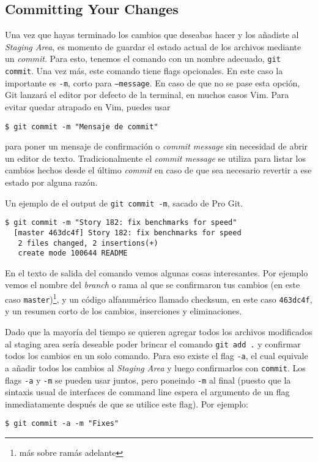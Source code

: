 \documentclass[spanish, 12pt, a4paper]{article}
\begin{document}
\subsection{Committing Your Changes}
Una vez que hayas terminado los cambios que deseabas hacer y los añadiste al
\textit{Staging Area}, es momento de guardar el estado actual de los archivos
mediante un \textit{commit}.
Para esto, tenemos el comando con un nombre adecuado, \texttt{git commit}.
Una vez más, este comando tiene flags opcionales.
En este caso la importante es \texttt{-m}, corto para \texttt{--message}.
En caso de que no se pase esta opción, Git lanzará el editor por defecto de la
terminal, en muchos casos Vim.
Para evitar quedar atrapado en Vim, puedes usar
\begin{lstlisting}
$ git commit -m "Mensaje de commit"
\end{lstlisting}
para poner un mensaje de confirmación o \textit{commit message} sin necesidad de
abrir un editor de texto.
Tradicionalmente el \textit{commit message} se utiliza para listar los cambios
hechos desde el último \textit{commit} en caso de que sea necesario revertir a
ese estado por alguna razón.

Un ejemplo de el output de \texttt{git commit -m}, sacado de Pro Git.
\begin{lstlisting}
$ git commit -m "Story 182: fix benchmarks for speed"
  [master 463dc4f] Story 182: fix benchmarks for speed
   2 files changed, 2 insertions(+)
   create mode 100644 README
\end{lstlisting}

En el texto de salida del comando vemos algunas cosas interesantes.
Por ejemplo vemos el nombre del \textit{branch} o rama al que se confirmaron tus
cambios (en este caso \texttt{master})\footnote{más sobre ramás adelante}, y un
código alfanumérico llamado checksum, en este caso \texttt{463dc4f}, y un
resumen corto de los cambios, inserciones y eliminaciones.

Dado que la mayoría del tiempo se quieren agregar todos los archivos modificados
al staging area sería deseable poder brincar el comando \texttt{git add .} y
confirmar todos los cambios en un solo comando.
Para eso existe el flag \texttt{-a}, el cual equivale a añadir todos los cambios
al \textit{Staging Area} y luego confirmarlos con \texttt{commit}.
Los flags \texttt{-a} y \texttt{-m} se pueden usar juntos, pero poneindo
\texttt{-m} al final (puesto que la sintaxis usual de interfaces de command line
espera el argumento de un flag inmediatamente después de que se utilice este
flag).
Por ejemplo:
\begin{lstlisting}
$ git commit -a -m "Fixes"
\end{lstlisting}
\end{document}
